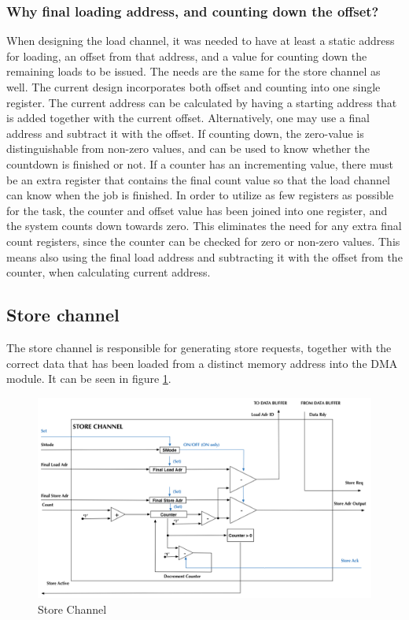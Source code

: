 \begin{appendix}
\subsubsection{Why final loading address, and counting down the offset?}
When designing the load channel, it was needed to have at least a static address for loading, an offset from that address, and a value for counting down the remaining loads to be issued.
The needs are the same for the store channel as well.
The current design incorporates both offset and counting into one single register.
The current address can be calculated by having a starting address that is added together with the current offset.
Alternatively, one may use a final address and subtract it with the offset.
If counting down, the zero-value is distinguishable from non-zero values, and can be used to know whether the countdown is finished or not.
If a counter has an incrementing value, there must be an extra register that contains the final count value so that the load channel can know when the job is finished.
In order to utilize as few registers as possible for the task, the counter and offset value has been joined into one register, and the system counts down towards zero.
This eliminates the need for any extra final count registers, since the counter can be checked for zero or non-zero values.
This means also using the final load address and subtracting it with the offset from the counter, when calculating current address.

\subsection{Store channel}
The store channel is responsible for generating store requests, together with the correct data that has been loaded from a distinct memory address into the DMA module.
It can be seen in figure \ref{fig:storeChannel}.

\begin{figure}[htb]
    \centering
    \includegraphics[width=1.0\textwidth]{Figures/DMA/StoreChannel}
    \caption{Store Channel}
    \label{fig:storeChannel}
\end{figure}


\end{appendix}
